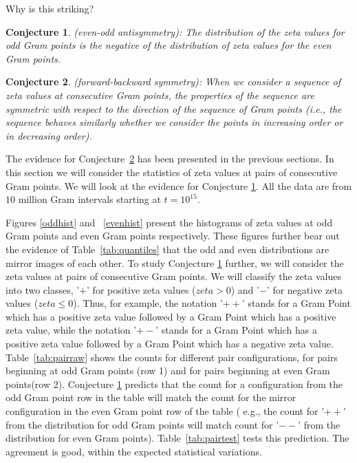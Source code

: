 \documentclass[twoside]{article}
\newtheorem{mydef}{Conjecture}
\theoremstyle{definition}
\begin{document}
Why is this striking?

\begin{mydef}\label{antisymmetry}
(even-odd antisymmetry): The distribution of the zeta values for odd Gram points is the negative of the distribution of zeta values for the even Gram points.
\end{mydef}
\begin{mydef}\label{symmetry}
(forward-backward symmetry): When we consider a sequence of zeta values at consecutive Gram points, the properties of the sequence are symmetric with respect to the direction of the sequence of Gram points (i.e., the sequence behaves similarly whether we consider the points in increasing order or in decreasing order).
\end{mydef}

The evidence for  Conjecture~\ref{symmetry} has been presented in the previous sections. 
In this section we will consider the statistics of zeta values at pairs of consecutive Gram points. We will look at the evidence for Conjecture \ref{antisymmetry}.  All the data  are from $10$ million Gram intervals starting at $t=10^{15}$.

Figures \ref{oddhist} and ~\ref{evenhist}  present the histograms of zeta values at odd Gram points and even Gram points respectively. These figures further bear out the evidence of Table~\ref{tab:quantiles} that the odd and even distributions are mirror images of each other. To study Conjecture \ref{antisymmetry} further, we will consider the zeta values at pairs of consecutive Gram points. We will classify the zeta values into two classes, '$+$' for positive zeta values ($zeta > 0$) and '$-$' for negative zeta values ($zeta \leqslant  0$). Thus, for example, the notation '$++$' stands for a Gram Point which has a positive zeta value followed by a Gram Point which has a positive zeta value, while the notation '$+-$' stands for a Gram Point which has a positive zeta value followed by a Gram Point which has a negative zeta value. Table~\ref{tab:pairraw} shows the counts for different pair configurations, for pairs beginning at odd Gram points (row 1) and for pairs beginning at even Gram points(row 2). Conjecture \ref{antisymmetry} predicts that the count for a configuration from the odd Gram point row in the table  will match the count for the mirror configuration in the even Gram point row of the table ( e.g., the count for '$++$' from the distribution for odd Gram points will match count for '$--$' from the distribution for even Gram points). Table~\ref{tab:pairtest} tests this prediction. The agreement is good, within the expected statistical variations. 
\end{document}
